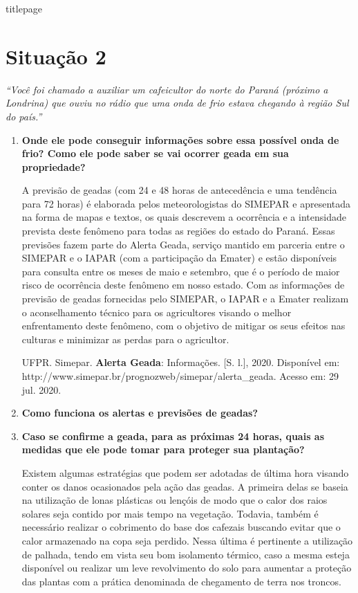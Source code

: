 \documentclass[a4paper, 12pt, brazilian]{article}
\begin{document}
	{titlepage}
	
	\section{Situação 2}
	
	\textit{``Você foi chamado a auxiliar um cafeicultor do norte do Paraná (próximo a Londrina) que ouviu no rádio que uma onda de frio estava chegando à região Sul do país.''}
	
	\begin{enumerate}
		\item\textbf{Onde ele pode conseguir informações sobre essa possível onda de frio? Como ele pode saber se vai ocorrer geada em sua propriedade?}
		
		\hspace{.5cm} A previsão de geadas (com 24 e 48 horas de antecedência e uma tendência para 72 horas) é elaborada pelos meteorologistas do SIMEPAR e apresentada na forma de mapas e textos, os quais descrevem a ocorrência e a intensidade prevista deste fenômeno para todas as regiões do estado do Paraná.
		Essas previsões fazem parte do Alerta Geada, serviço mantido em parceria entre o SIMEPAR e o IAPAR (com a participação da Emater) e estão disponíveis para consulta entre os meses de maio e setembro, que é o período de maior risco de ocorrência deste fenômeno em nosso estado.
		Com as informações de previsão de geadas fornecidas pelo SIMEPAR, o IAPAR e a Emater realizam o aconselhamento técnico para os agricultores visando o melhor enfrentamento deste fenômeno, com o objetivo de mitigar os seus efeitos nas culturas e minimizar as perdas para o agricultor.
		
		UFPR. Simepar. \textbf{Alerta Geada}: Informações. [S. l.], 2020. Disponível em: http://www.simepar.br/prognozweb/simepar/alerta\_geada. Acesso em: 29 jul. 2020.
		
		\item\textbf{Como funciona os alertas e previsões de geadas?}
		
		\item\textbf{Caso se confirme a geada, para as próximas 24 horas, quais as medidas que ele pode tomar para proteger sua plantação?}
		
		Existem algumas estratégias que podem ser adotadas de última hora visando conter os danos ocasionados pela ação das geadas. A primeira delas se baseia na utilização de lonas plásticas ou lençóis de modo que o calor dos raios solares seja contido por mais tempo na vegetação. Todavia, também é necessário realizar o cobrimento do base dos cafezais buscando evitar que o calor armazenado na copa seja perdido. Nessa última é pertinente a utilização de palhada, tendo em vista seu bom isolamento térmico, caso a mesma esteja disponível ou realizar um leve revolvimento do solo para aumentar a proteção das plantas com a prática denominada de chegamento de terra nos troncos.
		

\end{enumerate}
\end{document}
